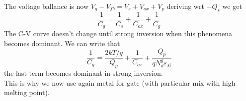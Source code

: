 The voltage ballance is now $V_g-V_{fb}=V_s+V_{ox}+V_p$ deriving wrt $-Q_s$ we get 
\begin{equation}
\frac{1}{C_{g}}=\frac{1}{C_{s}}+\frac{1}{C_{ox}}+\frac{1}{C_{g}}
\end{equation}
The C-V curve doesn't change until strong inversion when this phenomena becomes dominant. We can write that 
\begin{equation}
\frac{1}{C_g}=\frac{2kT/q}{Q_p}+\frac{1}{C_{ox}}+\frac{Q_p}{qN_d^{g}\varepsilon_{si}}
\end{equation}
the last term becomes dominant in strong inversion.\\
This is why we now use again metal for gate (with particular mix with high melting point).\\
































